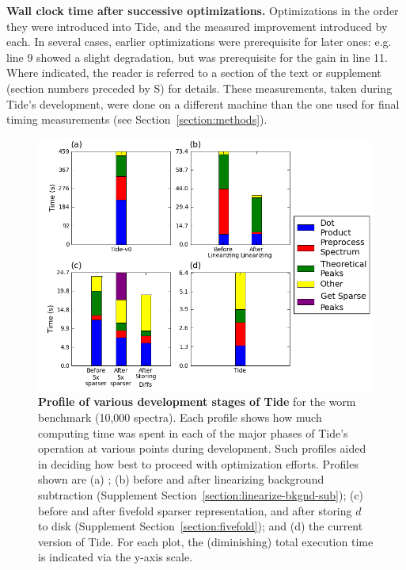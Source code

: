 \begin{table}
\centering

\caption[Wall clock time after successive optimizations]{{\bf Wall clock time
    after successive optimizations.}  Optimizations in the order they were
  introduced into Tide, and the measured improvement introduced by each. In
  several cases, earlier optimizations were prerequisite for later ones:
  e.g. line 9 showed a slight degradation, but was prerequisite for the gain in
  line 11. Where indicated, the reader is referred to a section of the text or
  supplement (section numbers preceded by S) for details.  These measurements,
  taken during Tide's development, were done on a different machine than the one
  used for final timing measurements (see Section~\ref{section:methods}).
  \label{table:timing}}
\end{table}

\begin{figure}
\centering
\includegraphics[width=6.0in]{profiles.png}
\caption[Profile of various development stages of Tide]{{\bf Profile of various
    development stages of Tide} for the worm benchmark (10,000 spectra).  Each
  profile shows how much computing time was spent in each of the major phases of
  Tide's operation at various points during development.  Such profiles aided in
  deciding how best to proceed with optimization efforts. Profiles shown are (a)
  \tidezero; (b) before and after linearizing background subtraction (Supplement
  Section~\ref{section:linearize-bkgnd-sub}); (c) before and after fivefold
  sparser representation, and after storing $d$ to disk (Supplement
  Section~\ref{section:fivefold}); and (d) the current version of Tide. For each
  plot, the (diminishing) total execution time is indicated via the y-axis
  scale.
  \label{figure:profiles}}
\end{figure}

